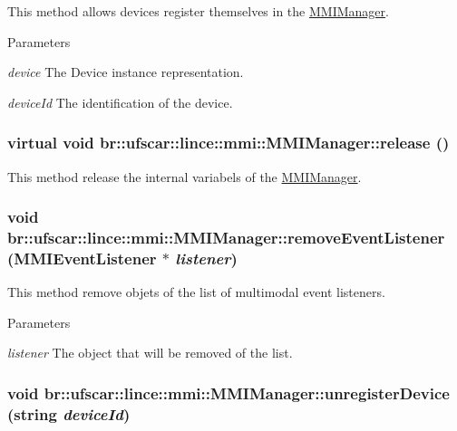 This method allows devices register themselves in the \hyperlink{classbr_1_1ufscar_1_1lince_1_1mmi_1_1MMIManager}{MMIManager}. 


\begin{DoxyParams}{Parameters}
\item[{\em device}]The Device instance representation. \item[{\em deviceId}]The identification of the device. \end{DoxyParams}
\hypertarget{classbr_1_1ufscar_1_1lince_1_1mmi_1_1MMIManager_a2e9b5dd15d1c2bd1f34192193c840365}{
\subsubsection[{release}]{\setlength{\rightskip}{0pt plus 5cm}virtual void br::ufscar::lince::mmi::MMIManager::release ()}}
\label{classbr_1_1ufscar_1_1lince_1_1mmi_1_1MMIManager_a2e9b5dd15d1c2bd1f34192193c840365}


This method release the internal variabels of the \hyperlink{classbr_1_1ufscar_1_1lince_1_1mmi_1_1MMIManager}{MMIManager}. 

\hypertarget{classbr_1_1ufscar_1_1lince_1_1mmi_1_1MMIManager_af301df4426b81e014b718a0a9cfb398f}{
\subsubsection[{removeEventListener}]{\setlength{\rightskip}{0pt plus 5cm}void br::ufscar::lince::mmi::MMIManager::removeEventListener ({\bf MMIEventListener} $\ast$ {\em listener})}}
\label{classbr_1_1ufscar_1_1lince_1_1mmi_1_1MMIManager_af301df4426b81e014b718a0a9cfb398f}


This method remove objets of the list of multimodal event listeners. 


\begin{DoxyParams}{Parameters}
\item[{\em listener}]The object that will be removed of the list. \end{DoxyParams}
\hypertarget{classbr_1_1ufscar_1_1lince_1_1mmi_1_1MMIManager_a67dfd0985484c895eb0081521835dd7b}{
\subsubsection[{unregisterDevice}]{\setlength{\rightskip}{0pt plus 5cm}void br::ufscar::lince::mmi::MMIManager::unregisterDevice (string {\em deviceId})}}
\label{classbr_1_1ufscar_1_1lince_1_1mmi_1_1MMIManager_a67dfd0985484c895eb0081521835dd7b}


